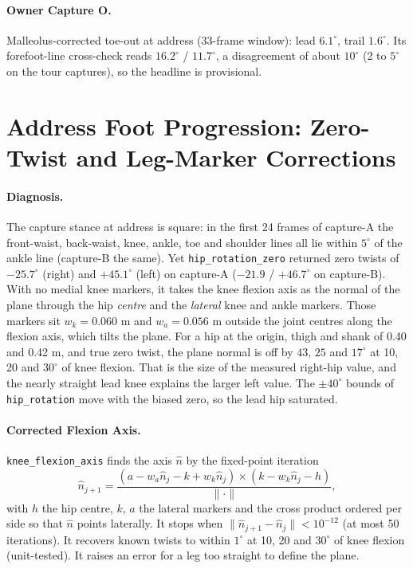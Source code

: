 \documentclass[11pt]{article}
\begin{document}
\paragraph{Owner Capture O.} Malleolus-corrected toe-out at address (33-frame
window): lead $6.1^\circ$, trail $1.6^\circ$. Its forefoot-line cross-check
reads $16.2^\circ$ / $11.7^\circ$, a disagreement of about $10^\circ$ (2 to
$5^\circ$ on the tour captures), so the headline is provisional.

\section{Address Foot Progression: Zero-Twist and Leg-Marker Corrections}
\label{sec:zero}

\paragraph{Diagnosis.} The capture stance at address is square: in the
first 24 frames of capture-A the front-waist, back-waist, knee, ankle, toe
and shoulder lines all lie within $5^\circ$ of the ankle line (capture-B
the same). Yet \texttt{hip\_rotation\_zero} returned zero twists of
$-25.7^\circ$ (right) and $+45.1^\circ$ (left) on capture-A ($-21.9$ /
$+46.7^\circ$ on capture-B). With no medial knee markers, it takes the knee
flexion axis as the normal of the plane through the hip \emph{centre} and
the \emph{lateral} knee and ankle markers. Those markers sit $w_k = 0.060$ m
and $w_a = 0.056$ m outside the joint centres along the flexion axis, which
tilts the plane. For a hip at the origin, thigh and shank of 0.40 and
0.42 m, and true zero twist, the plane normal is off by $43$, $25$ and
$17^\circ$ at 10, 20 and $30^\circ$ of knee flexion. That is the size of the
measured right-hip value, and the nearly straight lead knee explains the
larger left value. The $\pm40^\circ$ bounds of \texttt{hip\_rotation} move
with the biased zero, so the lead hip saturated.

\paragraph{Corrected Flexion Axis.} \texttt{knee\_flexion\_axis} finds the
axis $\hat n$ by the fixed-point iteration
\begin{equation}
  \hat n_{j+1} = \frac{(a - w_a \hat n_j - k + w_k \hat n_j) \times
  (k - w_k \hat n_j - h)}{\lVert\cdot\rVert},
\end{equation}
with $h$ the hip centre, $k$, $a$ the lateral markers and the cross product
ordered per side so that $\hat n$ points laterally. It stops when
$\lVert\hat n_{j+1}-\hat n_j\rVert < 10^{-12}$ (at most 50 iterations). It
recovers known twists to within $1^\circ$ at 10, 20 and $30^\circ$ of knee
flexion (unit-tested). It raises an error for a leg too straight to define
the plane.
\end{document}
